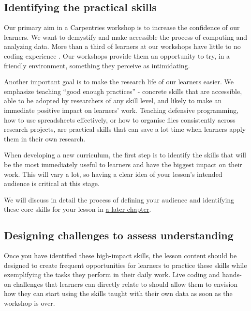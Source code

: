 \documentclass[
]{book}
\begin{document}
\hypertarget{identifying-the-practical-skills}{%
\subsection{Identifying the practical skills}\label{identifying-the-practical-skills}}

Our primary aim in a Carpentries workshop is to increase the confidence of our learners. We
want to demystify and make accessible the process of computing and analyzing data. More than
a third of learners at our workshops have little to no coding experience \citep{jordan2018assessment}. Our workshops provide them an
opportunity to try, in a friendly environment, something they perceive as intimidating.

Another important goal is to make the research life of our learners easier. We
emphasize teaching ``good enough practices'' \citep{wilson2017goodenough} - concrete
skills that are accessible, able to be adopted by researchers of any skill
level, and likely to make an immediate positive impact on learners' work.
Teaching defensive programming, how to use spreadsheets effectively, or how to
organise files consistently across research projects, are practical skills that
can save a lot time when learners apply them in their own research.

When developing a new curriculum, the first step is to identify the skills that will be the
most immediately useful to learners and have the biggest impact on their work. This will
vary a lot, so having a clear idea of your lesson's intended audience is critical at this
stage.

We will discuss in detail the process of defining your
audience and identifying these core skills for your lesson
in \protect\hyperlink{deciding-what-to-teach}{a later chapter}.

\hypertarget{designing-challenges-to-assess-understanding}{%
\subsection{Designing challenges to assess understanding}\label{designing-challenges-to-assess-understanding}}

Once you have identified these high-impact skills, the lesson content should be designed to
create frequent opportunities for learners to practice these skills while exemplifying the
tasks they perform in their daily work. Live coding and hands-on challenges that learners
can directly relate to should allow them to envision how they can start using the skills
taught with their own data as soon as the workshop is over.
\end{document}
